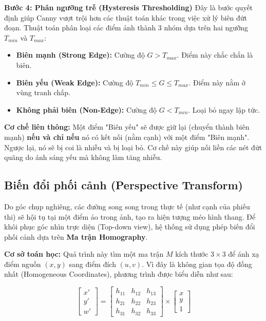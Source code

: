 \documentclass[6pt, a4paper]{report}
\begin{document}
	\textbf{Bước 4: Phân ngưỡng trễ (Hysteresis Thresholding)}
	Đây là bước quyết định giúp Canny vượt trội hơn các thuật toán khác trong việc xử lý biên đứt đoạn. Thuật toán phân loại các điểm ảnh thành 3 nhóm dựa trên hai ngưỡng $T_{min}$ và $T_{max}$:
	
	\begin{itemize}
		\item \textbf{Biên mạnh (Strong Edge):} Cường độ $G > T_{max}$. Điểm này chắc chắn là biên.
		\item \textbf{Biên yếu (Weak Edge):} Cường độ $T_{min} \le G \le T_{max}$. Điểm này nằm ở vùng tranh chấp.
		\item \textbf{Không phải biên (Non-Edge):} Cường độ $G < T_{min}$. Loại bỏ ngay lập tức.
	\end{itemize}
	
	\textbf{Cơ chế liên thông:} Một điểm "Biên yếu" sẽ được giữ lại (chuyển thành biên mạnh) \textbf{nếu và chỉ nếu} nó có kết nối (nằm cạnh) với một điểm "Biên mạnh". Ngược lại, nó sẽ bị coi là nhiễu và bị loại bỏ. Cơ chế này giúp nối liền các nét đứt quãng do ánh sáng yếu mà không làm tăng nhiễu.
	
	\subsection{Biến đổi phối cảnh (Perspective Transform)}
	Do góc chụp nghiêng, các đường song song trong thực tế (như cạnh của phiếu thi) sẽ hội tụ tại một điểm ảo trong ảnh, tạo ra hiện tượng méo hình thang. Để khôi phục góc nhìn trực diện (Top-down view), hệ thống sử dụng phép biến đổi phối cảnh dựa trên \textbf{Ma trận Homography}.
	
	\textbf{Cơ sở toán học:}
	Quá trình này tìm một ma trận $M$ kích thước $3 \times 3$ để ánh xạ điểm nguồn $(x, y)$ sang điểm đích $(u, v)$. Vì đây là không gian tọa độ đồng nhất (Homogeneous Coordinates), phương trình được biểu diễn như sau:
	
	\begin{equation}
		\begin{bmatrix} x' \\ y' \\ w' \end{bmatrix} = \begin{bmatrix} h_{11} & h_{12} & h_{13} \\ h_{21} & h_{22} & h_{23} \\ h_{31} & h_{32} & h_{33} \end{bmatrix} \times \begin{bmatrix} x \\ y \\ 1 \end{bmatrix}
	\end{equation}
	
\end{document}
